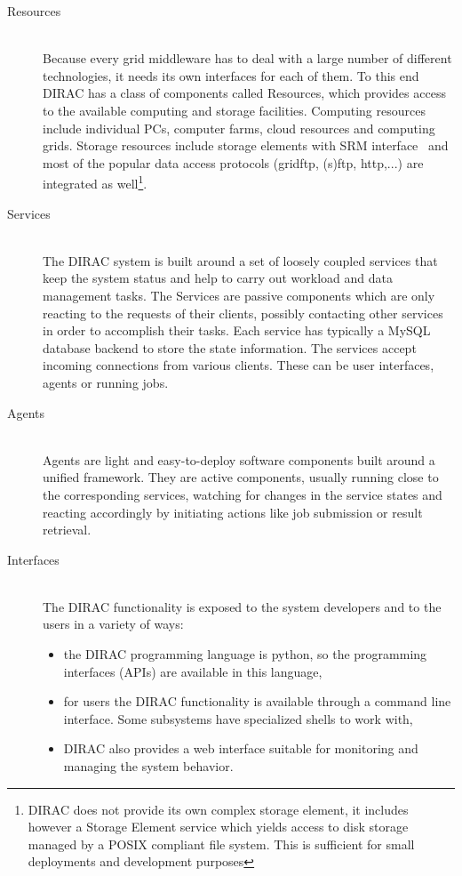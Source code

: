 \begin{description}

\item[Resources] \hfill \\
Because every grid middleware has to deal with a large number of different technologies, it needs its own 
interfaces for each of them. To this end DIRAC has a class of components called Resources,
which provides access to the available computing and storage facilities. 
Computing resources include individual PCs, computer farms, cloud resources and computing grids. Storage 
resources include storage elements with SRM interface~\cite{SRM} and most of the popular data access 
protocols (gridftp, (s)ftp, http,...) are integrated as well\footnote{DIRAC does not provide its own complex 
storage element, it includes however a Storage Element service which yields access to disk 
storage managed by a POSIX compliant file system. This is sufficient for small deployments and development
purposes}.

\pagebreak

\item[Services] \hfill \\
The DIRAC system is built around a set of loosely coupled services that keep the system status and
help to carry out workload and data management tasks. The Services are passive components which
are only reacting to the requests of their clients, possibly contacting other services in order to
accomplish their tasks. Each service has typically a MySQL~\cite{MySQL} database backend to store the state
information. The services accept incoming connections from various clients. These can be user interfaces,
agents or running jobs. 

\item[Agents] \hfill \\
Agents are light and easy-to-deploy software components built around a unified framework. They are active
components, usually running close to the corresponding services, watching for changes in the service states and 
reacting accordingly by initiating actions like job submission or result retrieval. 

\item[Interfaces] \hfill \\
The DIRAC functionality is exposed to the system developers and to the users in a variety of ways:
	\begin{itemize}
		\item the DIRAC programming language is python, so the programming interfaces (APIs) are available in this 
			language,
		\item for users the DIRAC functionality is available through a command line interface. Some subsystems 		
			have specialized shells to work with,
		\item DIRAC also provides a web interface suitable for monitoring and managing the system behavior.
	\end{itemize}

\end{description}

